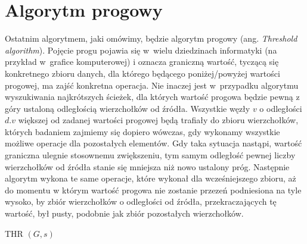 \section{Algorytm progowy}



Ostatnim algorytmem, jaki omówimy, będzie algorytm progowy (ang. \textit{Threshold algorithm}).
Pojęcie progu pojawia się w~wielu dziedzinach informatyki (na przykład w~grafice komputerowej) i oznacza graniczną wartość, tyczącą się konkretnego zbioru danych, dla którego będącego poniżej/powyżej wartości progowej, ma zajść konkretna operacja.
Nie inaczej jest w~przypadku algorytmu wyszukiwania najkrótszych ścieżek, dla których wartość progowa będzie pewną z góry ustaloną odległością wierzchołków od źródła.
Wszystkie węzły $v$ o odległości $d.v$ większej od zadanej wartości progowej będą trafiały do zbioru wierzchołków, których badaniem zajmiemy się dopiero wówczas, gdy wykonamy wszystkie możliwe operacje dla pozostałych elementów.
Gdy taka sytuacja nastąpi, wartość graniczna ulegnie stosownemu zwiększeniu, tym samym odległość pewnej liczby wierzchołków od źródła stanie się mniejsza niż nowo ustalony próg.
Następnie algorytm wykona te same operacje, które wykonał dla wcześniejszego zbioru, aż do momentu w którym wartość progowa nie zostanie przezeń podniesiona na tyle wysoko, by zbiór wierzchołków o odległości od źródła, przekraczających tę wartość, był pusty, podobnie jak zbiór pozostałych wierzchołków.

\begin{pseudokod}[!htbp]
	\DontPrintSemicolon
	\caption{
		THR $\left( G, s \right)$
	}
	\label{alg:ThresholdAlgorith}
\end{pseudokod}


